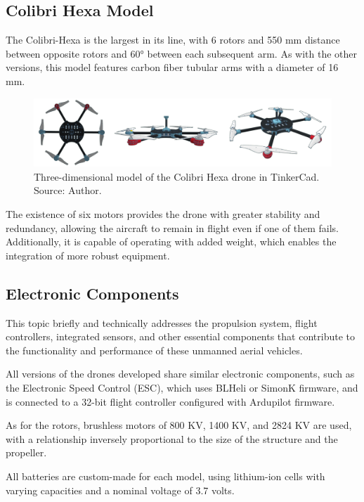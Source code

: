 \documentclass[conference]{IEEEtran}
\begin{document}
\subsection{Colibri Hexa Model}
The Colibri-Hexa is the largest in its line, with 6 rotors and 550 mm distance between opposite rotors and 60° between each subsequent arm. As with the other versions, this model features carbon fiber tubular arms with a diameter of 16 mm.

\begin{figure}[!htb]
    \centering
    \includegraphics[scale=0.14]{img/Colibri-hexa.png} 
    \caption{Three-dimensional model of the Colibri Hexa drone in TinkerCad. Source: Author.}
    \label{fig:my_label}
\end{figure}

The existence of six motors provides the drone with greater stability and redundancy, allowing the aircraft to remain in flight even if one of them fails. Additionally, it is capable of operating with added weight, which enables the integration of more robust equipment.

\subsection{Electronic Components}

This topic briefly and technically addresses the propulsion system, flight controllers, integrated sensors, and other essential components that contribute to the functionality and performance of these unmanned aerial vehicles.

All versions of the drones developed share similar electronic components, such as the Electronic Speed Control (ESC), which uses BLHeli or SimonK firmware, and is connected to a 32-bit flight controller configured with Ardupilot firmware.

As for the rotors, brushless motors of 800 KV, 1400 KV, and 2824 KV are used, with a relationship inversely proportional to the size of the structure and the propeller.

All batteries are custom-made for each model, using lithium-ion cells with varying capacities and a nominal voltage of 3.7 volts.
\end{document}
